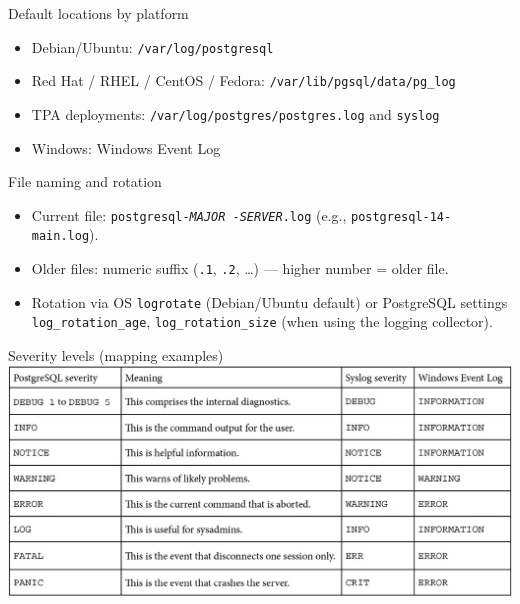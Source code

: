 \documentclass[aspectratio=169]{beamer}
\begin{document}
\begin{frame}{Default locations by platform}
  \begin{itemize}
    \item Debian/Ubuntu: \texttt{/var/log/postgresql}
    \item Red Hat / RHEL / CentOS / Fedora: \texttt{/var/lib/pgsql/data/pg\_log}
    \item TPA deployments: \texttt{/var/log/postgres/postgres.log} and \texttt{syslog}
    \item Windows: Windows Event Log
  \end{itemize}
\end{frame}

\begin{frame}{File naming and rotation}
  \begin{itemize}
    \item Current file: \texttt{postgresql-\textit{MAJOR}\,-\textit{SERVER}.log} (e.g., \texttt{postgresql-14-main.log}).
    \item Older files: numeric suffix (\texttt{.1}, \texttt{.2}, \dots) --- higher number = older file.
    \item Rotation via OS \texttt{logrotate} (Debian/Ubuntu default) or PostgreSQL settings
          \texttt{log\_rotation\_age}, \texttt{log\_rotation\_size} (when using the logging collector).
  \end{itemize}
\end{frame}

\begin{frame}{Severity levels (mapping examples)}
  \centering
  \includegraphics[width=\textwidth]{figures/postgres-severity}
\end{frame}
\end{document}
